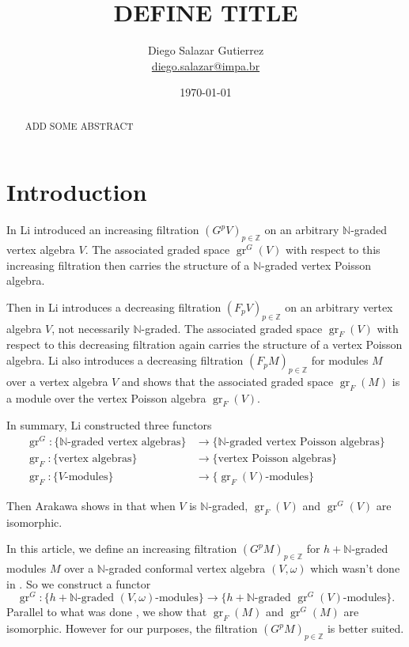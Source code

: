 \documentclass[12pt,a4paper]{article}
\DeclareMathOperator{\gr}{gr}
\begin{document}
\title{DEFINE TITLE}
\author{Diego Salazar Gutierrez \\ \href{mailto:diego.salazar@impa.br}{diego.salazar@impa.br}}
\date{\today}
\maketitle

\begin{abstract}
  ADD SOME ABSTRACT
\end{abstract}

\section{Introduction}
\label{sec:introduction}

In \cite{li_vertex_2002} Li introduced an increasing filtration $(G^pV)_{p\in \mathbb{Z}}$ on an arbitrary $\mathbb{N}$-graded vertex algebra $V$.
The associated graded space $\gr^G(V)$ with respect to this increasing filtration then carries the structure of a $\mathbb{N}$-graded vertex Poisson algebra.

Then in \cite{li_abelianizing_2005} Li introduces a decreasing filtration $(F_pV)_{p\in \mathbb{Z}}$ on an arbitrary vertex algebra $V$, not necessarily $\mathbb{N}$-graded.
The associated graded space $\gr_F(V)$ with respect to this decreasing filtration again carries the structure of a vertex Poisson algebra.
Li also introduces a decreasing filtration $(F_pM)_{p\in \mathbb{Z}}$ for modules $M$ over a vertex algebra $V$ and shows that the associated graded space $\gr_F(M)$ is a module over the vertex Poisson algebra $\gr_F(V)$.

In summary, Li constructed three functors
\begin{align*}
  \gr^G:\{\text{$\mathbb{N}$-graded vertex algebras}\}&\to \{\text{$\mathbb{N}$-graded vertex Poisson algebras}\} \\
  \gr_F:\{\text{vertex algebras}\}&\to \{\text{vertex Poisson algebras}\} \\
  \gr_F:\{\text{$V$-modules}\}&\to \{\text{$\gr_F(V)$-modules}\}
\end{align*}

Then Arakawa shows in \cite[Proposition 2.6.1]{arakawa_remark_2012} that when $V$ is $\mathbb{N}$-graded, $\gr_F(V)$ and $\gr^G(V)$ are isomorphic.

In this article, we define an increasing filtration $(G^pM)_{p\in \mathbb{Z}}$ for $h+\mathbb{N}$-graded modules $M$ over a $\mathbb{N}$-graded conformal vertex algebra $(V,\omega)$ which wasn't done in \cite{li_vertex_2002}.
So we construct a functor
\begin{equation*}
  \gr^G:\{\text{$h+\mathbb{N}$-graded $(V,\omega)$-modules}\}\to \{\text{$h+\mathbb{N}$-graded $\gr^G(V)$-modules}\}.
\end{equation*}
Parallel to what was done \cite{arakawa_remark_2012}, we show that $\gr_F(M)$ and $\gr^G(M)$ are isomorphic.
However for our purposes, the filtration $(G^pM)_{p\in \mathbb{Z}}$ is better suited.
\end{document}
